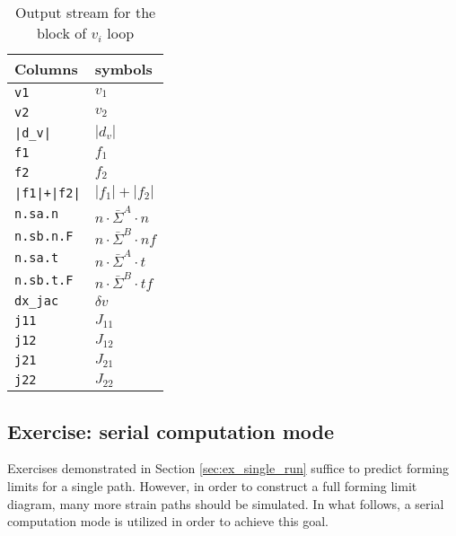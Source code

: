 \documentclass[12pt]{amsart}
\begin{document}
\begin{table}
  \caption{Output stream for the block of $v_i$ loop}
  \label{tab:vi_loop}
  \begin{tabular}{l|l}
    Columns          &   symbols\\
    \hline
    \verb$v1$        &   $v_1$ \\
    \verb$v2$        &   $v_2$ \\
    \verb$|d_v|$     &   $|d_v|$ \\
    \verb$f1$        &   $f_1$ \\
    \verb$f2$        &   $f_2$ \\
    \verb$|f1|+|f2|$ &   $|f_1|+|f_2|$ \\
    \verb$n.sa.n$    &   $n \cdot \bar{\Sigma}^A\cdot n$ \\
    \verb$n.sb.n.F$  &   $n \cdot \bar{\Sigma}^B\cdot n f$ \\
    \verb$n.sa.t$    &   $n \cdot \bar{\Sigma}^A\cdot t$ \\
    \verb$n.sb.t.F$  &   $n \cdot \bar{\Sigma}^B\cdot t f$ \\
    \verb$dx_jac$    &   $\delta{v}$ \\
    \verb$j11$       &   $J_{11}$ \\
    \verb$j12$       &   $J_{12}$ \\
    \verb$j21$       &   $J_{21}$ \\
    \verb$j22$       &   $J_{22}$
  \end{tabular}
\end{table}

\newpage
\subsection{Exercise: serial computation mode}
\label{sec:ex_serial_run}
Exercises demonstrated in Section \ref{sec:ex_single_run} suffice to predict forming limits for a single path.
However, in order to construct a full forming limit diagram, many more strain paths should be simulated.
In what follows, a serial computation mode is utilized in order to achieve this goal.
\end{document}
